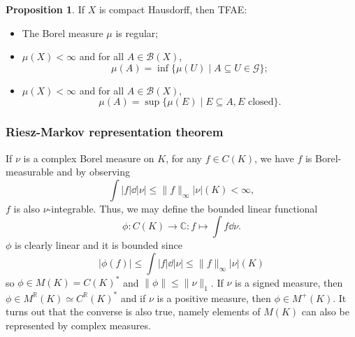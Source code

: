 \documentclass[]{article}
\theoremstyle{definition}
\newtheorem{proposition}{Proposition}[section]
\begin{document}
\begin{proposition}
  If \(X\) is compact Hausdorff, then TFAE:
  \begin{itemize}
    \item The Borel measure \(\mu\) is regular;
    \item \(\mu(X) < \infty\) and for all \(A \in \mathcal{B}(X)\), 
      \[\mu(A) = \inf\{\mu(U) \mid A \subseteq U \in \mathcal{G}\};\]
    \item \(\mu(X) < \infty\) and for all \(A \in \mathcal{B}(X)\), 
      \[\mu(A) = \sup\{\mu(E) \mid E \subseteq A, E \text{ closed}\}.\]
  \end{itemize}
\end{proposition}

\subsubsection{Riesz-Markov representation theorem}

If \(\nu\) is a complex Borel measure on \(K\), for any \(f \in C(K)\), we have \(f\) is Borel-measurable 
and by observing
\[\int |f| \dd |\nu| \le \|f\|_\infty |\nu|(K) < \infty,\]
\(f\) is also \(\nu\)-integrable. Thus, we may define the bounded linear functional
\[\phi : C(K) \to \mathbb{C} : f \mapsto \int f \dd \nu.\]
\(\phi\) is clearly linear and it is bounded since 
\[|\phi(f)| \le \int |f| \dd |\nu| \le \|f\|_\infty |\nu|(K)\]
so \(\phi \in M(K) = C(K)^*\) and \(\|\phi\| \le \|\nu\|_1\). If \(\nu\) is a signed measure, then 
\(\phi \in M^\mathbb{R}(K) \simeq C^\mathbb{R}(K)^*\) and if \(\nu\) is a positive measure, then 
\(\phi \in M^+(K)\). It turns out that the converse is also true, namely elements of \(M(K)\) can also 
be represented by complex measures.
\end{document}
